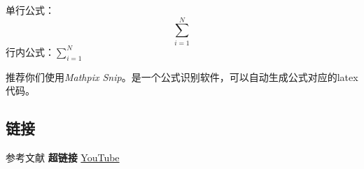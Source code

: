 \documentclass[a4paper]{article}
\begin{document}
单行公式：$$\sum^N_{i=1}$$
行内公式：$\sum^N_{i=1}$

推荐你们使用\textit{Mathpix Snip}。是一个公式识别软件，可以自动生成公式对应的latex代码。

\subsection{链接}
参考文献\cite{quinn1994parallel}\cite{golub2014scientific}\cite{joseph2022parallel}
\textbf{超链接}  \href{http://youtube.com/}{YouTube}

\newpage


\end{document}
